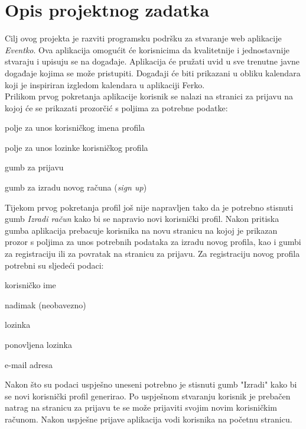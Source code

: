 \chapter{Opis projektnog zadatka}
		
		\indent Cilj ovog projekta je razviti programsku podršku za stvaranje web aplikacije \textit{Eventko}. Ova aplikacija omogućit će korisnicima da kvalitetnije i jednostavnije stvaraju i upisuju se na događaje. Aplikacija će pružati uvid u sve trenutne javne događaje kojima se može pristupiti. Događaji će biti prikazani u obliku kalendara koji je inspiriran izgledom kalendara u aplikaciji Ferko. \\
			
		\indent Prilikom prvog pokretanja aplikacije korisnik se nalazi na stranici za prijavu na kojoj će se prikazati prozorčić s poljima za potrebne podatke:
		
		\begin{packed_item}
			\item polje za unos korisničkog imena profila
			\item polje za unos lozinke korisničkog profila
			\item gumb za prijavu
			\item gumb za izradu novog računa (\textit{sign up})
		\end{packed_item}
		
		\indent Tijekom prvog pokretanja profil još nije napravljen tako da je potrebno stisnuti gumb \textit{Izradi račun} kako bi se napravio novi korisnički profil. Nakon pritiska gumba aplikacija prebacuje korisnika na novu stranicu na kojoj je prikazan prozor s poljima za unos potrebnih podataka za izradu novog profila, kao i gumbi za registraciju ili za povratak na stranicu za prijavu. Za registraciju novog profila potrebni su sljedeći podaci:
		
		\begin{packed_item}
			\item korisničko ime
			\item nadimak (neobavezno)
			\item lozinka
			\item ponovljena lozinka
			\item e-mail adresa
		\end{packed_item}
	
		\indent Nakon što su podaci uspješno uneseni potrebno je stisnuti gumb "Izradi" kako bi se novi korisnički profil generirao. Po uspješnom stvaranju korisnik je prebačen natrag na stranicu za prijavu te se može prijaviti svojim novim korisničkim računom. Nakon uspješne prijave aplikacija vodi korisnika na početnu stranicu. \\
		
